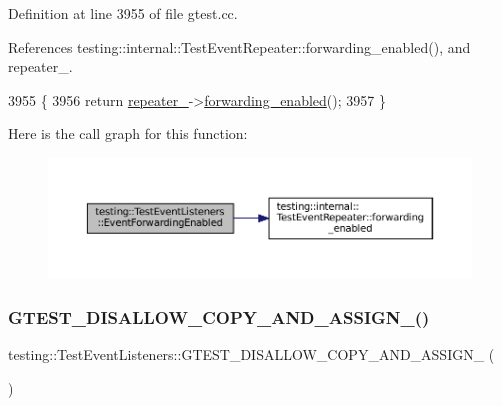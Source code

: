 Definition at line 3955 of file gtest.\+cc.



References testing\+::internal\+::\+Test\+Event\+Repeater\+::forwarding\+\_\+enabled(), and repeater\+\_\+.


\begin{DoxyCode}
3955                                                       \{
3956   \textcolor{keywordflow}{return} \hyperlink{classtesting_1_1TestEventListeners_a625d58b951893e80cde12862aece6fd8}{repeater\_}->\hyperlink{classtesting_1_1internal_1_1TestEventRepeater_abaf2bfc453fc0e1005fcfb0f95deac4c}{forwarding\_enabled}();
3957 \}
\end{DoxyCode}
Here is the call graph for this function\+:
\nopagebreak
\begin{figure}[H]
\begin{center}
\leavevmode
\includegraphics[width=350pt]{classtesting_1_1TestEventListeners_aa1878baf16a50f30f6435fad3c68ef3f_cgraph}
\end{center}
\end{figure}
\mbox{\label{classtesting_1_1TestEventListeners_a31d12292abc277dedbb7dc7748a6a60e}} 
\subsubsection{\texorpdfstring{G\+T\+E\+S\+T\+\_\+\+D\+I\+S\+A\+L\+L\+O\+W\+\_\+\+C\+O\+P\+Y\+\_\+\+A\+N\+D\+\_\+\+A\+S\+S\+I\+G\+N\+\_\+()}{GTEST\_DISALLOW\_COPY\_AND\_ASSIGN\_()}}
{\footnotesize\ttfamily testing\+::\+Test\+Event\+Listeners\+::\+G\+T\+E\+S\+T\+\_\+\+D\+I\+S\+A\+L\+L\+O\+W\+\_\+\+C\+O\+P\+Y\+\_\+\+A\+N\+D\+\_\+\+A\+S\+S\+I\+G\+N\+\_\+ (\begin{DoxyParamCaption}\item[{\hyperlink{classtesting_1_1TestEventListeners}{Test\+Event\+Listeners}}]{ }\end{DoxyParamCaption})\hspace{0.3cm}{\ttfamily [private]}}

